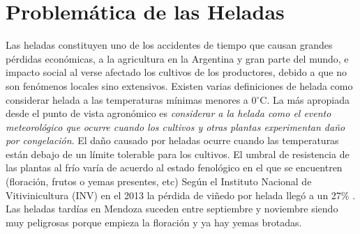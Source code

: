 \documentclass[final,a4paper]{llncs}
\newcommand{\degree}{$^{\circ}$}
\begin{document}
\section{Problemática de las Heladas}

Las heladas constituyen uno de los accidentes de tiempo que causan grandes pérdidas 
económicas, a la agricultura en la Argentina y gran parte del mundo, e impacto
social al verse afectado los cultivos de los productores, debido a que no son fenómenos 
locales sino extensivos. Existen varias definiciones de helada como considerar helada a las 
temperaturas mínimas menores a 0\degree C. La más apropiada desde el punto de vista agronómico
es \emph{considerar a la helada como el evento meteorológico que ocurre cuando los cultivos 
y otras plantas experimentan daño por congelación}. El daño causado por heladas ocurre 
cuando las temperaturas están debajo de un límite tolerable para
los cultivos. El umbral de resistencia de las plantas al frío varía de acuerdo 
al estado fenológico en el que se encuentren (floración, frutos o yemas presentes, etc) 
Según el Instituto Nacional de Vitivinicultura (INV) en el 2013 la pérdida de viñedo por
helada llegó a un 27\% \cite{inv-news}. Las heladas tardías en Mendoza suceden entre septiembre y noviembre
siendo muy peligrosas porque empieza la floración y ya hay yemas brotadas. 
\end{document}
